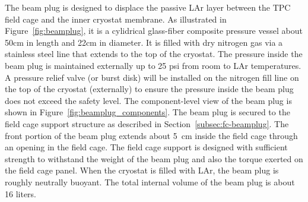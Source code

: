 
The beam plug is designed to displace the passive LAr layer between the TPC field cage and the inner cryostat membrane. As illustrated in Figure~\ref{fig:beamplug}, it is a cylidrical glass-fiber composite pressure vessel about 50cm in length and  22cm in diameter. It is filled with dry nitrogen gas via a stainless steel line that extends to the top of the cryostat. The pressure inside the beam plug is maintained externally up to 25 psi from room to LAr temperatures. A pressure relief valve (or burst disk) will be installed on the nitrogen fill line on the top of the cryostat (externally) to ensure the pressure inside the beam plug does not exceed the safety level. The component-level view of the beam plug is shown in Figure~\ref{fig:beamplug_components}.  The beam plug is secured to the field cage support structure as described in Section~\ref{subsec:fc-beamplug}. The front portion of the beam plug extends about 5~cm inside the field cage through an opening in the field cage. The field cage support is designed with sufficient strength to withstand the weight of the beam plug and also the torque exerted on the field cage panel. 
When the cryostat is filled with LAr, the beam plug is roughly neutrally buoyant.  The total internal volume of the beam plug is about 16 liters. 

